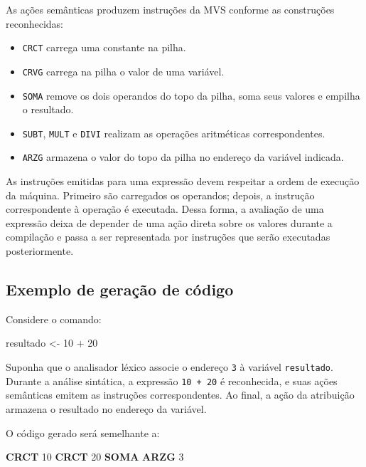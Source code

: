 \documentclass[
  brazilian,
  letterpaper,
]{book}
\newenvironment{Shaded}{\begin{snugshade}}{\end{snugshade}}
\newcommand{\DecValTok}[1]{\textcolor[rgb]{0.68,0.00,0.00}{#1}}
\newcommand{\KeywordTok}[1]{\textcolor[rgb]{0.00,0.23,0.31}{\textbf{#1}}}
\newcommand{\NormalTok}[1]{\textcolor[rgb]{0.00,0.23,0.31}{#1}}
\providecommand{\tightlist}{%
  \setlength{\itemsep}{0pt}\setlength{\parskip}{0pt}}
\theoremstyle{plain}
\theoremstyle{definition}
\theoremstyle{remark}
\begin{document}
As ações semânticas produzem instruções da MVS conforme as construções
reconhecidas:

\begin{itemize}
\tightlist
\item
  \texttt{CRCT} carrega uma constante na pilha.
\item
  \texttt{CRVG} carrega na pilha o valor de uma variável.
\item
  \texttt{SOMA} remove os dois operandos do topo da pilha, soma seus
  valores e empilha o resultado.
\item
  \texttt{SUBT}, \texttt{MULT} e \texttt{DIVI} realizam as operações
  aritméticas correspondentes.
\item
  \texttt{ARZG} armazena o valor do topo da pilha no endereço da
  variável indicada.
\end{itemize}

As instruções emitidas para uma expressão devem respeitar a ordem de
execução da máquina. Primeiro são carregados os operandos; depois, a
instrução correspondente à operação é executada. Dessa forma, a
avaliação de uma expressão deixa de depender de uma ação direta sobre os
valores durante a compilação e passa a ser representada por instruções
que serão executadas posteriormente.

\subsection{Exemplo de geração de
código}\label{exemplo-de-gerauxe7uxe3o-de-cuxf3digo}

Considere o comando:

\begin{Shaded}
\begin{Highlighting}[]
\NormalTok{resultado \textless{}{-} }\DecValTok{10}\NormalTok{ + }\DecValTok{20}
\end{Highlighting}
\end{Shaded}

Suponha que o analisador léxico associe o endereço \texttt{3} à variável
\texttt{resultado}. Durante a análise sintática, a expressão
\texttt{10\ +\ 20} é reconhecida, e suas ações semânticas emitem as
instruções correspondentes. Ao final, a ação da atribuição armazena o
resultado no endereço da variável.

O código gerado será semelhante a:

\begin{Shaded}
\begin{Highlighting}[]
\KeywordTok{CRCT}    \DecValTok{10}
\KeywordTok{CRCT}    \DecValTok{20}
\KeywordTok{SOMA}
\KeywordTok{ARZG}    \DecValTok{3}
\end{Highlighting}
\end{Shaded}
\end{document}

